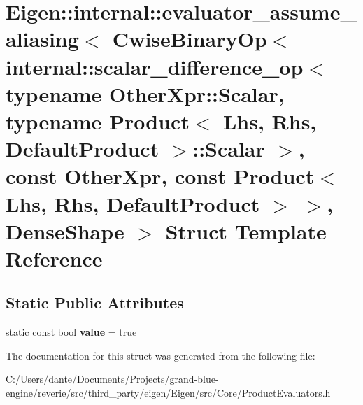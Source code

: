 \hypertarget{struct_eigen_1_1internal_1_1evaluator__assume__aliasing_3_01_cwise_binary_op_3_01internal_1_1sca69efad99c33943cb3731d094798b855b}{}\section{Eigen\+::internal\+::evaluator\+\_\+assume\+\_\+aliasing$<$ Cwise\+Binary\+Op$<$ internal\+::scalar\+\_\+difference\+\_\+op$<$ typename Other\+Xpr\+::Scalar, typename Product$<$ Lhs, Rhs, Default\+Product $>$\+::Scalar $>$, const Other\+Xpr, const Product$<$ Lhs, Rhs, Default\+Product $>$ $>$, Dense\+Shape $>$ Struct Template Reference}
\label{struct_eigen_1_1internal_1_1evaluator__assume__aliasing_3_01_cwise_binary_op_3_01internal_1_1sca69efad99c33943cb3731d094798b855b}
\subsection*{Static Public Attributes}
\begin{DoxyCompactItemize}
\item 
\mbox{\label{struct_eigen_1_1internal_1_1evaluator__assume__aliasing_3_01_cwise_binary_op_3_01internal_1_1sca69efad99c33943cb3731d094798b855b_a91fe1a85c82b4ac00e6ed96c1bc1d431}} 
static const bool {\bfseries value} = true
\end{DoxyCompactItemize}


The documentation for this struct was generated from the following file\+:\begin{DoxyCompactItemize}
\item 
C\+:/\+Users/dante/\+Documents/\+Projects/grand-\/blue-\/engine/reverie/src/third\+\_\+party/eigen/\+Eigen/src/\+Core/Product\+Evaluators.\+h\end{DoxyCompactItemize}
